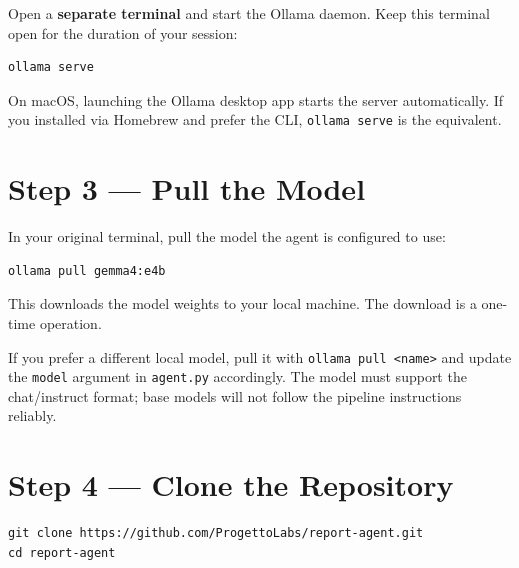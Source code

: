 \documentclass[12pt, a4paper]{article}
\begin{document}
Open a \textbf{separate terminal} and start the Ollama daemon. Keep this terminal open for the duration of your session:

\begin{lstlisting}[style=shellstyle]
ollama serve
\end{lstlisting}

\begin{notebox}
On macOS, launching the Ollama desktop app starts the server automatically. If you installed via Homebrew and prefer the CLI, \texttt{ollama serve} is the equivalent.
\end{notebox}

\section{Step 3 — Pull the Model}

In your original terminal, pull the model the agent is configured to use:

\begin{lstlisting}[style=shellstyle]
ollama pull gemma4:e4b
\end{lstlisting}

This downloads the model weights to your local machine. The download is a one-time operation.

\begin{notebox}
If you prefer a different local model, pull it with \texttt{ollama pull <name>} and update the \texttt{model} argument in \texttt{agent.py} accordingly. The model must support the chat/instruct format; base models will not follow the pipeline instructions reliably.
\end{notebox}

\section{Step 4 — Clone the Repository}

\begin{lstlisting}[style=shellstyle]
git clone https://github.com/ProgettoLabs/report-agent.git
cd report-agent
\end{lstlisting}

\end{document}
